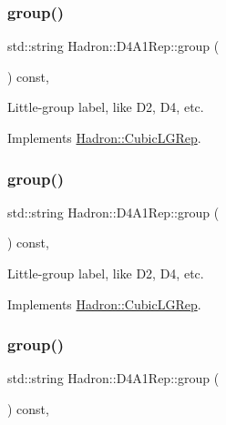 \subsubsection{\texorpdfstring{group()}{group()}\hspace{0.1cm}{\footnotesize\ttfamily [3/5]}}
{\footnotesize\ttfamily std\+::string Hadron\+::\+D4\+A1\+Rep\+::group (\begin{DoxyParamCaption}{ }\end{DoxyParamCaption}) const\hspace{0.3cm}{\ttfamily [inline]}, {\ttfamily [virtual]}}

Little-\/group label, like D2, D4, etc. 

Implements \mbox{\hyperlink{structHadron_1_1CubicLGRep_a9bdb14b519a611d21379ed96a3a9eb41}{Hadron\+::\+Cubic\+L\+G\+Rep}}.

\mbox{\label{structHadron_1_1D4A1Rep_a53f15be3789b2544092cd724838cbac8}} 
\subsubsection{\texorpdfstring{group()}{group()}\hspace{0.1cm}{\footnotesize\ttfamily [4/5]}}
{\footnotesize\ttfamily std\+::string Hadron\+::\+D4\+A1\+Rep\+::group (\begin{DoxyParamCaption}{ }\end{DoxyParamCaption}) const\hspace{0.3cm}{\ttfamily [inline]}, {\ttfamily [virtual]}}

Little-\/group label, like D2, D4, etc. 

Implements \mbox{\hyperlink{structHadron_1_1CubicLGRep_a9bdb14b519a611d21379ed96a3a9eb41}{Hadron\+::\+Cubic\+L\+G\+Rep}}.

\mbox{\label{structHadron_1_1D4A1Rep_a53f15be3789b2544092cd724838cbac8}} 
\subsubsection{\texorpdfstring{group()}{group()}\hspace{0.1cm}{\footnotesize\ttfamily [5/5]}}
{\footnotesize\ttfamily std\+::string Hadron\+::\+D4\+A1\+Rep\+::group (\begin{DoxyParamCaption}{ }\end{DoxyParamCaption}) const\hspace{0.3cm}{\ttfamily [inline]}, {\ttfamily [virtual]}}

